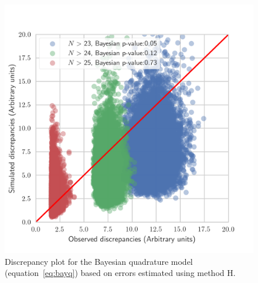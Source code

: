 \documentclass[a4paper,fleqn,usenatbib]{mnras}
\begin{document}
\begin{figure}
	\includegraphics[scale=0.7]{discq.png}
    \caption{Discrepancy plot for the Bayesian quadrature model (equation~\ref{eq:bayq}) based on errors estimated using method H. }
    \label{fig:discq}
\end{figure}
\end{document}

